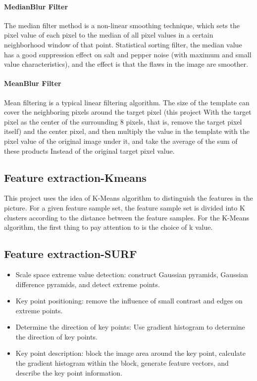 \documentclass[conference]{IEEEtran}
\begin{document}
\paragraph{MedianBlur Filter}
The median filter method is a non-linear smoothing technique, which sets the pixel value of each pixel to the median of all pixel values in a certain neighborhood window of that point. Statistical sorting filter, the median value has a good suppression effect on salt and pepper noise (with maximum and small value characteristics), and the effect is that the flaws in the image are smoother.
\paragraph{MeanBlur Filter}
Mean filtering is a typical linear filtering algorithm. The size of the template can cover the neighboring pixels around the target pixel (this project With the target pixel as the center of the surrounding 8 pixels, that is, remove the target pixel itself) and the center pixel, and then multiply the value in the template with the pixel value of the original image under it, and take the average of the sum of these products Instead of the original target pixel value.


\subsection{Feature extraction-Kmeans}
This project uses the idea of K-Means algorithm to distinguish the features in the picture. For a given feature sample set, the feature sample set is divided into K clusters according to the distance between the feature samples. For the K-Means algorithm, the first thing to pay attention to is the choice of k value. 
\subsection{Feature extraction-SURF}
\begin{itemize}
\item Scale space extreme value detection: construct Gaussian pyramids, Gaussian difference pyramids, and detect extreme points.
\item Key point positioning: remove the influence of small contrast and edges on extreme points.
\item Determine the direction of key points: Use gradient histogram to determine the direction of key points.
\item Key point description: block the image area around the key point, calculate the gradient histogram within the block, generate feature vectors, and describe the key point information.
\end{itemize}
\end{document}
